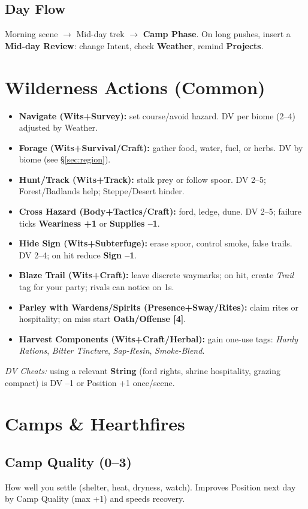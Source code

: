 \documentclass[11pt]{article}
\begin{document}
\subsection{Day Flow}
Morning scene $\to$ Mid-day trek $\to$ \textbf{Camp Phase}. On long pushes, insert a \textbf{Mid-day Review}: change Intent, check \textbf{Weather}, remind \textbf{Projects}.

\section{Wilderness Actions (Common)}\label{sec:actions}
\begin{itemize}
  \item \textbf{Navigate (Wits+Survey):} set course/avoid hazard. DV per biome (2--4) adjusted by Weather.
  \item \textbf{Forage (Wits+Survival/Craft):} gather food, water, fuel, or herbs. DV by biome (see §\ref{sec:region}).
  \item \textbf{Hunt/Track (Wits+Track):} stalk prey or follow spoor. DV 2--5; Forest/Badlands help; Steppe/Desert hinder.
  \item \textbf{Cross Hazard (Body+Tactics/Craft):} ford, ledge, dune. DV 2--5; failure ticks \textbf{Weariness +1} or \textbf{Supplies --1}.
  \item \textbf{Hide Sign (Wits+Subterfuge):} erase spoor, control smoke, false trails. DV 2--4; on hit reduce \textbf{Sign --1}.
  \item \textbf{Blaze Trail (Wits+Craft):} leave discrete waymarks; on hit, create \emph{Trail} tag for your party; rivals can notice on 1s.
  \item \textbf{Parley with Wardens/Spirits (Presence+Sway/Rites):} claim rites or hospitality; on miss start \textbf{Oath/Offense [4]}.
  \item \textbf{Harvest Components (Wits+Craft/Herbal):} gain one-use tags: \emph{Hardy Rations}, \emph{Bitter Tincture}, \emph{Sap-Resin}, \emph{Smoke-Blend}.
\end{itemize}
\emph{DV Cheats:} using a relevant \textbf{String} (ford rights, shrine hospitality, grazing compact) is DV --1 or Position +1 once/scene.

\section{Camps \& Hearthfires}\label{sec:camp}
\subsection{Camp Quality (0--3)}
How well you settle (shelter, heat, dryness, watch). Improves Position next day by Camp Quality (max +1) and speeds recovery.
\end{document}
